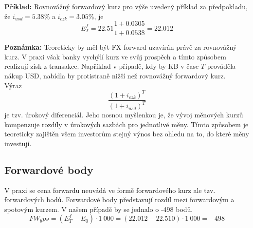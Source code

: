 \documentclass[a4paper]{book}
\begin{document}
\noindent \textbf{Příklad:} Rovnovážný forwardový kurz pro výše uvedený příklad za předpokladu, že $i_{usd}=5.38\%$ a $i_{czk}=3.05\%$, je
\begin{equation*}
E^f_T = 22.51 \frac{1 + 0.0305}{1 + 0.0538} = 22.012
\end{equation*}

\noindent \textbf{Poznámka:} Teoreticky by měl být FX forward uzavírán právě za rovnovážný kurz. V praxi však banky vychýlí kurz ve svůj prospěch a tímto způsobem realizují zisk z transakce. Například v případě, kdy by KB v čase $T$ prováděla nákup USD, nabídla by protistraně nižší než rovnovážný forwardový kurz.\\

Výraz
\begin{equation*}
\frac{(1 + i_{czk})^T}{(1 + i_{usd})^T}
\end{equation*}
je tzv. úrokový diferenciál. Jeho nosnou myšlenkou je, že vývoj měnových kurzů kompenzuje rozdíly v úrokových sazbách pro jednotlivé měny. Tímto způsobem je teoreticky zajištěn všem investorům stejný výnos bez ohledu na to, do které měny investují.

\subsection{Forwardové body}

V praxi se cena forwardu neuvádá ve formě forwardového kurz ale tzv. forwardových bodů. Forwardové body představují rozdíl mezi forwardovým a spotovým kurzem. V našem případě by se jednalo o -498 bodů.
\begin{equation*}
FW_bps = (E^f_T - E_0) \cdot 1~000 = (22.012 - 22.510) \cdot 1~000 = -498
\end{equation*}
\end{document}
